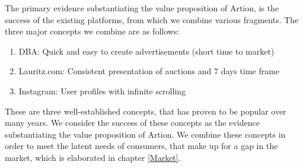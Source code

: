 The primary evidence substantiating the value proposition of Artion, is the success of the existing platforms, from which we combine various fragments. The three major concepts we combine are as follows: 
\begin{enumerate}
    \item DBA: Quick and easy to create advertisements (short time to market)
    \item Lauritz.com: Consistent presentation of auctions and 7 days time frame
    \item Instagram: User profiles with infinite scrolling 
\end{enumerate}
These are three well-established concepts, that has proven to be popular over many years. We consider the success of these concepts as the evidence substantiating the value proposition of Artion. We combine these concepts in order to meet the latent needs of consumers, that make up for a gap in the market, which is elaborated in chapter \ref{Market}.
